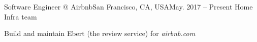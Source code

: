 


\begin{cventries}


\cvindustry
{Software Engineer @ Airbnb}{San Francisco, CA, USA}{May. 2017 -- Present}
{Home Infra team}
{
  \begin{cvitems}
  \item Build and maintain Ebert (the review service) for \emph{airbnb.com}
  \end{cvitems}
}

\end{cventries}
